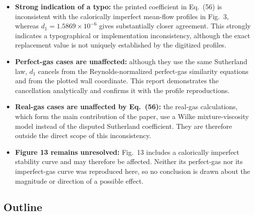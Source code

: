 \documentclass[11pt]{article}
\newcommand{\note}[2]{%
  \vspace{0.3em}%
  \noindent\colorbox{#1}{%
    \begin{minipage}{0.965\linewidth}
      #2
    \end{minipage}}%
  \vspace{0.3em}%
}
\begin{document}
\note{HypLightBlue}{%
\begin{itemize}
    \item \textbf{Strong indication of a typo:} the printed coefficient in Eq.~(56) is inconsistent with the calorically imperfect mean-flow profiles in Fig.~3, whereas \(d_1=1.5869\times10^{-6}\) gives substantially closer agreement. This strongly indicates a typographical or implementation inconsistency, although the exact replacement value is not uniquely established by the digitized profiles.
    \item \textbf{Perfect-gas cases are unaffected:} although they use the same Sutherland law, \(d_1\) cancels from the Reynolds-normalized perfect-gas similarity equations and from the plotted wall coordinate. This report demonstrates the cancellation analytically and confirms it with the profile reproductions.
    \item \textbf{Real-gas cases are unaffected by Eq.~(56):} the real-gas calculations, which form the main contribution of the paper, use a Wilke mixture-viscosity model instead of the disputed Sutherland coefficient. They are therefore outside the direct scope of this inconsistency.
    \item \textbf{Figure 13 remains unresolved:} Fig.~13 includes a calorically imperfect stability curve and may therefore be affected. Neither its perfect-gas nor its imperfect-gas curve was reproduced here, so no conclusion is drawn about the magnitude or direction of a possible effect.
\end{itemize}
}

\subsection*{Outline}
\end{document}
